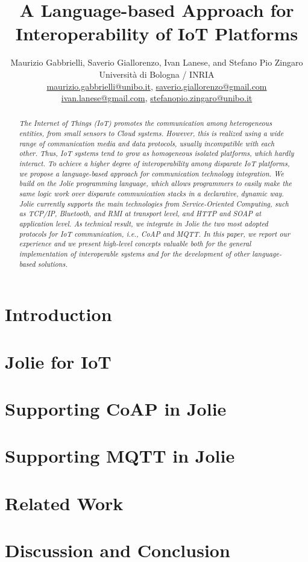 \documentclass[10pt]{article}
\title{A Language-based Approach for Interoperability of IoT
Platforms}
\author{Maurizio Gabbrielli, Saverio Giallorenzo, Ivan Lanese, and Stefano Pio
Zingaro 
\\
Universit\`a di Bologna / INRIA \\
{\underline{maurizio.gabbrielli@unibo.it}, 
  \underline{ saverio.giallorenzo@gmail.com}}\\
  {\underline{ivan.lanese@gmail.com},
  \underline{stefanopio.zingaro@unibo.it}
  } \\
}
\date{}
\begin{document}
\maketitle

\begin{abstract}

\normalfont\itshape The Internet of Things (IoT) promotes the communication
among heterogeneous entities, from small sensors to Cloud systems. However,
this is realized using a wide range of communication media and data protocols,
usually incompatible with each other. Thus, IoT systems tend to grow as
homogeneous isolated platforms, which hardly interact. To achieve a higher
degree of interoperability among disparate IoT platforms, we propose a
language-based approach for communication technology integration. We build on
the Jolie programming language, which allows programmers to easily make the
same logic work over disparate communication stacks in a declarative, dynamic
way. Jolie currently supports the main technologies from Service-Oriented
Computing, such as TCP/IP, Bluetooth, and RMI at transport level, and HTTP and
SOAP at application level. As technical result, we integrate in Jolie the two
most adopted protocols for IoT communication, i.e., CoAP and MQTT. In this
paper, we report our experience and we present high-level concepts valuable
both for the general implementation of interoperable systems and for the
development of other language-based solutions.
\end{abstract}

\section{Introduction}
\label{sec:intro}


\section{Jolie for IoT}
\label{sec:challenges}


\section{Supporting CoAP in Jolie}
\label{sub:coap}


\section{Supporting MQTT in Jolie}
\label{sub:mqtt}


\section{Related Work}
\label{sec:related}


\vspace{1em}
\section{Discussion and Conclusion}
\label{conclusion}


% 

\printbibliography
\end{document}
